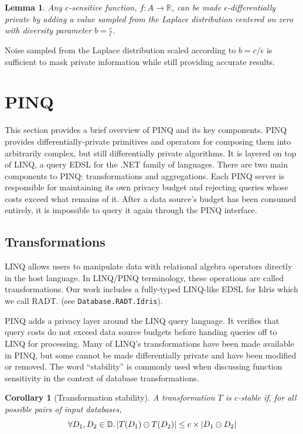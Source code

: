 \documentclass[12pt]{report}
\newtheorem{cor}[defn]{Corollary}
\newtheorem{lem}[defn]{Lemma}
\begin{document}
\begin{lem}
Any $c$-sensitive function, $f : A \rightarrow \mathbb R$, can be made $\epsilon$-differentially private by adding a value sampled from the Laplace distribution centered on zero with diversity parameter $b=\frac{c}{\epsilon}$.
\end{lem}

Noise sampled from the Laplace distribution scaled according to $b=c/\epsilon$ is sufficient to mask private information while still providing accurate results.

\section{PINQ}\label{sec:pinq}

This section provides a brief overview of PINQ and its key components.
PINQ provides differentially-private primitives and operators for composing them into arbitrarily complex, but still differentially private algorithms.
It is layered on top of LINQ, a query EDSL for the .NET family of languages.
There are two main components to PINQ: transformations and aggregations.
Each PINQ server is responsible for maintaining its own privacy budget and rejecting queries whose costs exceed what remains of it.
After a data source's budget has been consumed entirely, it is impossible to query it again through the PINQ interface.

\subsection{Transformations}

LINQ allows users to manipulate data with relational algebra operators directly in the host language.
In LINQ/PINQ terminology, these operations are called transformations.
Our work includes a fully-typed LINQ-like EDSL for Idris which we call RADT. (see \texttt{Database.RADT.Idris}).

PINQ adds a privacy layer around the LINQ query language.
It verifies that query costs do not exceed data source budgets before handing queries off to LINQ for processing.
Many of LINQ's transformations have been made available in PINQ, but some cannot be made differentially private and have been modified or removed.
The word ``stability'' is commonly used when discussing function sensitivity in the context of database transformations.

\begin{cor}[Transformation stability]
A transformation $T$ is $c$-stable if, for all possible pairs of input databases,
$$
  \forall D_1,D_2\in\mathbb D\ldotp |T(D_1)\ominus T(D_2)| \le c \times | D_1 \ominus D_2 |
$$
\end{cor}
\end{document}
